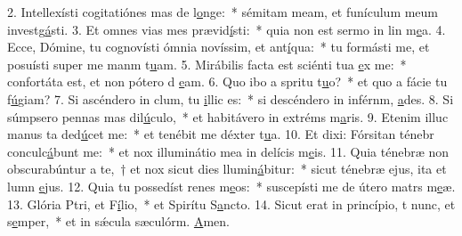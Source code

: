 2. Intellexísti cogitatiónes mas de l\uline{o}nge:~* sémitam meam, et funículum meum investg\uline{á}sti.
3. Et omnes vias mes prævid\uline{í}sti:~* quia non est sermo in lin m\uline{e}a.
4. Ecce, Dómine, tu cognovísti ómnia novíssim, et ant\uline{í}qua:~* tu formásti me, et posuísti super me manm t\uline{u}am.
5. Mirábilis facta est sciénti tua \uline{e}x me:~* confortáta est, et non pótero d \uline{e}am.
6. Quo ibo a spritu t\uline{u}o?~* et quo a fácie tu f\uline{ú}giam?
7. Si ascéndero in clum, tu \uline{i}llic es:~* si descéndero in inférnm, \uline{a}des.
8. Si súmpsero pennas mas dil\uline{ú}culo,~* et habitávero in extréms m\uline{a}ris.
9. Etenim illuc manus ta ded\uline{ú}cet me:~* et tenébit me déxter t\uline{u}a.
10. Et dixi: Fórsitan ténebr conculc\uline{á}bunt me:~* et nox illuminátio mea in delícis m\uline{e}is.
11. Quia ténebræ non obscurabúntur a te,~† et nox sicut dies llumin\uline{á}bitur:~* sicut ténebræ ejus, ita et lumn \uline{e}jus.
12. Quia tu possedíst renes m\uline{e}os:~* suscepísti me de útero matrs m\uline{e}æ.
13. Glória Ptri, et F\uline{í}lio,~* et Spirítu S\uline{a}ncto.
14. Sicut erat in princípio, t nunc, et s\uline{e}mper,~* et in sǽcula sæculórm. \uline{A}men.
